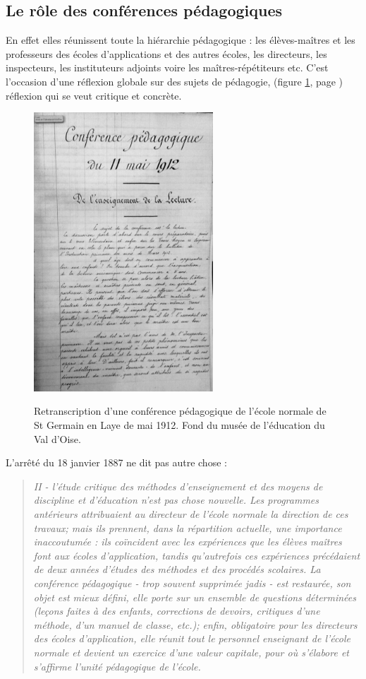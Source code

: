 \documentclass[a4paper,11pt]{article}
\begin{document}
			\subsection{Le rôle des conférences pédagogiques}
			En effet elles réunissent toute la hiérarchie pédagogique : les élèves-maîtres et les professeurs des écoles d'applications et des autres écoles, les directeurs, les inspecteurs, les instituteurs adjoints voire les maîtres-répétiteurs etc. C'est l'occasion d'une réflexion globale sur des sujets de pédagogie, (figure \ref{fig. 4}, page \pageref{fig. 4}) réflexion qui se veut critique et concrète.
			  \begin{figure}[!h]
			    \centering
			    \includegraphics[width=0.6\textwidth]{conf01.png}\\
			    \caption{Retranscription d'une conférence pédagogique de l'école normale de St Germain en Laye de mai 1912. Fond du musée de l'éducation du Val d'Oise.}
			    \label{fig. 4}
			  \end{figure}
			  L'arrêté du 18 janvier 1887 ne dit pas autre chose :
			\begin{quote}
			 \emph{II - l'étude critique des méthodes d'enseignement et des moyens de discipline et d'éducation n'est pas chose nouvelle. Les programmes antérieurs attribuaient au directeur de l'école normale la direction de ces travaux; mais ils prennent, dans la répartition actuelle, une importance inaccoutumée : ils coïncident avec les expériences que les élèves maîtres font aux écoles d'application, tandis qu'autrefois ces expériences précédaient de deux années d'études des méthodes et des procédés scolaires. La conférence pédagogique - trop souvent supprimée jadis - est restaurée, son objet est mieux défini, elle porte sur un ensemble de questions déterminées (leçons faites à des enfants, corrections de devoirs, critiques d'une méthode, d'un manuel de classe, etc.); enfin, obligatoire pour les directeurs des écoles d'application, elle réunit tout le personnel enseignant de l'école normale et devient un exercice d'une valeur capitale, pour où s'élabore et s'affirme l'unité pédagogique de l'école.}
			\end{quote}
\end{document}
